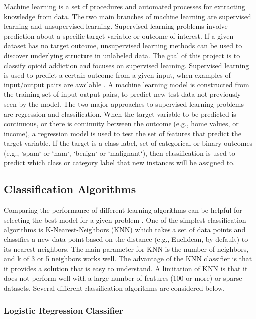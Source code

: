 \documentclass[sigconf]{acmart}
\begin{document}
Machine learning is a set of procedures and automated processes for extracting 
knowledge from data. The two main branches of machine learning are supervised 
learning and unsupervised learning. Supervised learning problems involve 
prediction about a specific target variable or outcome of interest. If a given 
dataset has no target outcome, unsupervised learning methods can be used to 
discover underlying structure in unlabeled data. The goal of this project is 
to classify opioid addiction and focuses on supervised learning. Supervised 
learning is used to predict a certain outcome from a given input, when examples 
of input/output pairs are available \cite{muller17}. A machine learning model 
is constructed from the training set of input-output pairs, to predict new test 
data not previously seen by the model. The two major approaches to supervised 
learning problems are regression and classification. When the target variable 
to be predicted is continuous, or there is continuity between the outcome 
(e.g., home values, or income), a regression model is used to test the set of 
features that predict the target variable. If the target is a class label, set 
of categorical or binary outcomes (e.g., `spam` or `ham`, `benign` or 
`malignant`), then classification is used to predict which class or category 
label that new instances will be assigned to.

\subsection{Classification Algorithms} 

Comparing the performance of different learning algorithms can be helpful for 
selecting the best model for a given problem \cite{raschka17}. One of the 
simplest classification algorithms is K-Nearest-Neighbors (KNN) which takes 
a set of data points and classifies a new data point based on the distance 
(e.g., Euclidean, by default) to its nearest neighbors. The main parameter for
KNN is the number of neighbors, and k of 3 or 5 neighbors works well. The 
advantage of the KNN classifier is that it provides a solution that is easy to 
understand. A limitation of KNN is that it does not perform well with a large 
number of features (100 or more) or sparse datasets. Several different 
classification algorithms are considered below.

\subsubsection{Logistic Regression Classifier}
\end{document}
